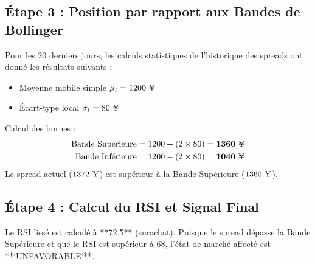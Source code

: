 \documentclass[12pt,a4paper]{article}
\begin{document}
\subsection{Étape 3 : Position par rapport aux Bandes de Bollinger}
Pour les 20 derniers jours, les calculs statistiques de l'historique des spreads ont donné les résultats suivants :
\begin{itemize}
    \item Moyenne mobile simple $\mu_t = 1200\text{ \yen}$
    \item Écart-type local $\sigma_t = 80\text{ \yen}$
\end{itemize}
Calcul des bornes :
\begin{align}
\text{Bande Supérieure} &= 1200 + (2 \times 80) = \mathbf{1360\text{ \yen}} \\
\text{Bande Inférieure} &= 1200 - (2 \times 80) = \mathbf{1040\text{ \yen}}
\end{align}
Le spread actuel ($1372\text{ \yen}$) est supérieur à la Bande Supérieure ($1360\text{ \yen}$).

\subsection{Étape 4 : Calcul du RSI et Signal Final}
Le RSI lissé est calculé à **72.5** (surachat). 
Puisque le spread dépasse la Bande Supérieure et que le RSI est supérieur à 68, l'état de marché affecté est **`UNFAVORABLE`**.
\end{document}
